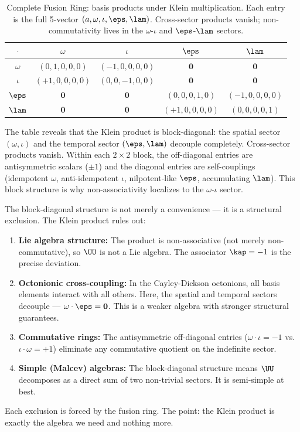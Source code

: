 \begin{table}[!ht]
\centering\small
\caption{Complete Fusion Ring: basis products under Klein multiplication. Each entry is the full 5-vector $(a, \omega, \iota, \eps, \lam)$. Cross-sector products vanish; non-commutativity lives in the $\omega$-$\iota$ and $\eps$-$\lam$ sectors.}
\label{tab:fusion}
\begin{tabular}{@{}c|cccc@{}}
\toprule
$\cdot$ & $\omega$ & $\iota$ & $\eps$ & $\lam$ \\
\midrule
$\omega$ & $(0,1,0,0,0)$ & $(-1,0,0,0,0)$ & $\mathbf{0}$ & $\mathbf{0}$ \\
$\iota$ & $(+1,0,0,0,0)$ & $(0,0,-1,0,0)$ & $\mathbf{0}$ & $\mathbf{0}$ \\
$\eps$ & $\mathbf{0}$ & $\mathbf{0}$ & $(0,0,0,1,0)$ & $(-1,0,0,0,0)$ \\
$\lam$ & $\mathbf{0}$ & $\mathbf{0}$ & $(+1,0,0,0,0)$ & $(0,0,0,0,1)$ \\
\bottomrule
\end{tabular}
\end{table}

\begin{remark}
The table reveals that the Klein product is block-diagonal: the spatial sector $(\omega, \iota)$ and the temporal sector $(\eps, \lam)$ decouple completely. Cross-sector products vanish. Within each $2 \times 2$ block, the off-diagonal entries are antisymmetric scalars ($\pm 1$) and the diagonal entries are self-couplings (idempotent $\omega$, anti-idempotent $\iota$, nilpotent-like $\eps$, accumulating $\lam$). This block structure is why non-associativity localizes to the $\omega$-$\iota$ sector.
\end{remark}

\begin{remark}\label{rem:exclusion}
The block-diagonal structure is not merely a convenience --- it is a structural exclusion. The Klein product rules out:
\begin{enumerate}
\item \textbf{Lie algebra structure:} The product is non-associative (not merely non-commutative), so $\UU$ is not a Lie algebra. The associator $\kap = -1$ is the precise deviation.
\item \textbf{Octonionic cross-coupling:} In the Cayley-Dickson octonions, all basis elements interact with all others. Here, the spatial and temporal sectors decouple --- $\omega \cdot \eps = \mathbf{0}$. This is a weaker algebra with stronger structural guarantees.
\item \textbf{Commutative rings:} The antisymmetric off-diagonal entries ($\omega \cdot \iota = -1$ vs.\ $\iota \cdot \omega = +1$) eliminate any commutative quotient on the indefinite sector.
\item \textbf{Simple (Malcev) algebras:} The block-diagonal structure means $\UU$ decomposes as a direct sum of two non-trivial sectors. It is semi-simple at best.
\end{enumerate}
Each exclusion is forced by the fusion ring. The point: the Klein product is exactly the algebra we need and nothing more.
\end{remark}

